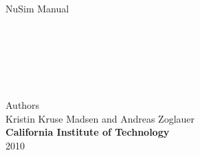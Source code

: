 %
\pagestyle{empty}
\begin{centering}
  \huge{NuSim Manual} \\
\begin{verbatim}



\end{verbatim}

\begin{figure}[h]
\end{figure}
\begin{verbatim}



\end{verbatim}

\large{Authors}\\
\large{Kristin Kruse Madsen and Andreas Zoglauer}\\


\normalsize{\textbf{California Institute of Technology}}\\
2010\\

\end{centering}
%
